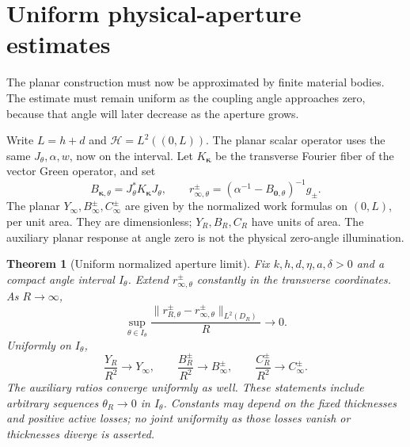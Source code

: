 \documentclass[11pt]{article}
\newtheorem{theorem}{Theorem}[section]
\newcommand{\norm}[1]{\lVert #1\rVert}
\begin{document}
\section{Uniform physical-aperture estimates}\label{sec:aperture}
The planar construction must now be approximated by finite material bodies. The estimate must remain uniform as the coupling angle approaches zero, because that angle will later decrease as the aperture grows.

Write $L=h+d$ and $\mathcal H=L^2((0,L))$. The planar scalar operator uses the same $J_\theta,\alpha,w$, now on the interval. Let $K_{\boldsymbol\kappa}$ be the transverse Fourier fiber of the vector Green operator, and set
\begin{equation}\label{eq:fibers}
 B_{\boldsymbol\kappa,\theta}=J_\theta^*K_{\boldsymbol\kappa}J_\theta,\qquad
 r_{\infty,\theta}^\pm=(\alpha^{-1}-B_{\mathbf0,\theta})^{-1}g_\pm.
\end{equation}
The planar $Y_\infty,B_\infty^\pm,C_\infty^\pm$ are given by the normalized work formulas on $(0,L)$, per unit area. They are dimensionless; $Y_R,B_R,C_R$ have units of area. The auxiliary planar response at angle zero is not the physical zero-angle illumination.

\begin{theorem}[Uniform normalized aperture limit]\label{thm:aperture}
Fix $k,h,d,\eta,a,\delta>0$ and a compact angle interval $I_\theta$. Extend $r_{\infty,\theta}^\pm$ constantly in the transverse coordinates. As $R\to\infty$,
\begin{equation}\label{eq:aperture-current}
 \sup_{\theta\in I_\theta}\frac{\norm{r_{R,\theta}^\pm-r_{\infty,\theta}^\pm}_{L^2(D_R)}}{R}\longrightarrow0.
\end{equation}
Uniformly on $I_\theta$,
\begin{equation}\label{eq:aperture-power}
 \frac{Y_R}{R^2}\to Y_\infty,\qquad
 \frac{B_R^\pm}{R^2}\to B_\infty^\pm,\qquad
 \frac{C_R^\pm}{R^2}\to C_\infty^\pm.
\end{equation}
The auxiliary ratios converge uniformly as well. These statements include arbitrary sequences $\theta_R\to0$ in $I_\theta$. Constants may depend on the fixed thicknesses and positive active losses; no joint uniformity as those losses vanish or thicknesses diverge is asserted.
\end{theorem}
\end{document}
